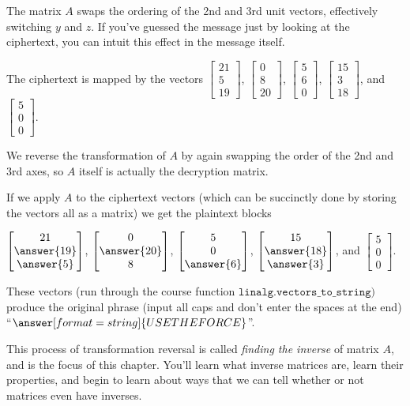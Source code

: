 \documentclass{ximera}
\begin{document}
\begin{solution}
  The matrix $A$ swaps the ordering of the 2nd and 3rd unit vectors, effectively switching $y$ and $z$. If you've guessed the message just by looking at the ciphertext, you can intuit this effect in the message itself.

  The ciphertext is mapped by the vectors $\begin{bmatrix}
    21 \\5\\19\end{bmatrix}$, $\begin{bmatrix}
    0 \\8\\20 \end{bmatrix}$, $\begin{bmatrix}
    5\\6\\0\end{bmatrix}$, $\begin{bmatrix}
    15\\3\\18\end{bmatrix}$, and $\begin{bmatrix}
    5\\0\\0\end{bmatrix}$.

  We reverse the transformation of $A$ by again swapping the order of the 2nd and 3rd axes, so $A$ itself is actually the decryption matrix.

  If we apply $A$ to the ciphertext vectors (which can be succinctly done by storing the vectors all as a matrix) we get the plaintext blocks 

  $\begin{bmatrix}
    21 \\\answer{19}\\\answer{5}\end{bmatrix}$, $\begin{bmatrix}
    0 \\\answer{20}\\8\end{bmatrix}$, $\begin{bmatrix}
    5\\0\\\answer{6}\end{bmatrix}$, $\begin{bmatrix}
    15\\\answer{18}\\\answer{3}\end{bmatrix}$, and $\begin{bmatrix}
    5\\0\\0\end{bmatrix}$.

  These vectors (run through the course function $\texttt{linalg.vectors\_to\_string})$ produce the original phrase (input all caps and don't enter the spaces at the end) ``$\answer[format=string]{USE THE FORCE}$''.

\end{solution}

This process of transformation reversal is called \emph{finding the inverse} of matrix $A$, and is the focus of this chapter. You'll learn what inverse matrices are, learn their properties, and begin to learn about ways that we can tell whether or not matrices even have inverses.
\end{document}
